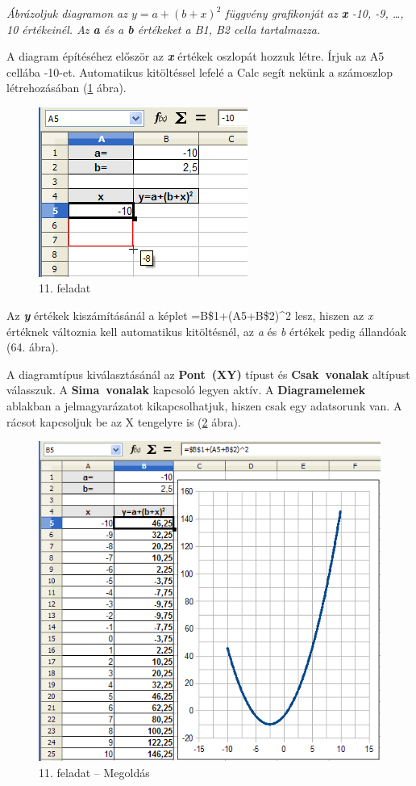 {\itshape
Ábrázoljuk diagramon az  $y=a+(b+x)^{2}$ függvény grafikonját
az \textbf{x} -10, -9, {\dots}, 10 értékeinél. Az \textbf{a} és
a \textbf{b} értékeket a B1, B2 cella tartalmazza.}

A diagram építéséhez először az \textbf{\textit{x}}
értékek oszlopát hozzuk létre. Írjuk az A5 cellába -10-et.
Automatikus kitöltéssel lefelé a Calc segít nekünk a
számoszlop létrehozásában (\ref{11-feladat} ábra).

\begin{figure}[!h]
\begin{center}
\includegraphics[width=6.851cm]{oocalcv2-img64.png}
\caption{11. feladat}\label{11-feladat}
\end{center}
\end{figure}

Az \textbf{\textit{y}} értékek kiszámításánál a képlet
=B\$1+(A5+B\$2)\^{}2 lesz, hiszen az \textit{x} értéknek
változnia kell automatikus kitöltésnél, az \textit{a} és
\textit{b} értékek pedig állandóak (64. ábra).

A diagramtípus kiválasztásánál az \textbf{Pont~(XY)} típust
és \textbf{Csak~vonalak} altípust válasszuk. A
\textbf{Sima~vonalak }kapcsoló legyen aktív. A
\textbf{Diagramelemek} ablakban a jelmagyarázatot kikapcsolhatjuk,
hiszen csak egy adatsorunk van.  A rácsot kapcsoljuk be az X
tengelyre is (\ref{11-feladatMegoldás} ábra).

\begin{figure}[!h]
\begin{center}
\includegraphics[width=12.458cm]{oocalcv2-img65.png}
\caption{11. feladat -- Megoldás}\label{11-feladatMegoldás}
\end{center}
\end{figure}

